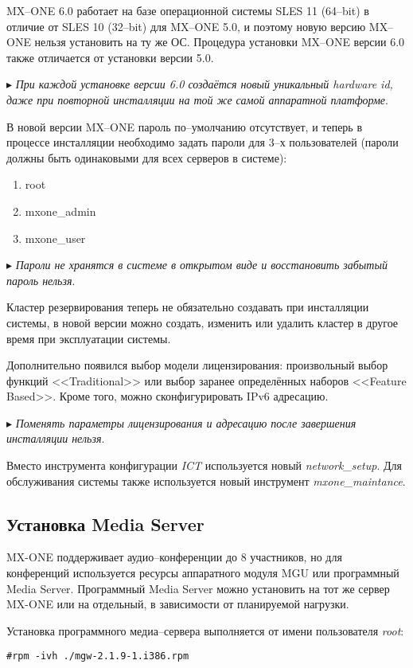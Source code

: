 MX--ONE 6.0 работает на базе операционной системы SLES 11 (64--bit) в отличие от SLES 10 (32--bit) для MX--ONE 5.0, и поэтому новую версию MX--ONE нельзя установить на ту же ОС. Процедура установки MX--ONE версии 6.0 также отличается от установки версии 5.0.

$\blacktriangleright$ {\em При каждой установке версии 6.0 создаётся новый уникальный {\em hardware id}, даже при повторной инсталляции на той же самой аппаратной платформе}.

В новой версии MX--ONE пароль по--умолчанию отсутствует, и теперь в процессе инсталляции необходимо задать пароли для 3--х пользователей (пароли должны быть одинаковыми для всех серверов в системе):
\begin{enumerate}
	\item root
	\item mxone\_admin
	\item mxone\_user
\end{enumerate}

$\blacktriangleright$ {\em Пароли не хранятся в системе в открытом виде и восстановить забытый пароль нельзя}.

Кластер резервирования теперь не обязательно создавать при инсталляции системы, в новой версии можно создать, изменить или удалить кластер в другое время при эксплуатации системы.

Дополнительно появился выбор модели лицензирования: произвольный выбор функций <<Traditional>> или выбор заранее определённых наборов <<Feature Based>>. Кроме того, можно сконфигурировать IPv6 адресацию.

$\blacktriangleright$ {\em Поменять параметры лицензирования и адресацию после завершения инсталляции нельзя}.

Вместо инструмента конфигурации {\em ICT} используется новый {\em network\_setup}. Для обслуживания системы также используется новый инструмент {\em mxone\_maintance}. 

\subsection{Установка Media Server}

MX-ONE поддерживает аудио--конференции до 8 участников, но для конференций используется ресурсы аппаратного модуля MGU или программный Media Server. Программный Media Server можно установить на тот же сервер MX-ONE или на отдельный, в зависимости от планируемой нагрузки.

Установка программного медиа--сервера выполняется от имени пользователя {\em root}:
\begin{lstlisting}
#rpm -ivh ./mgw-2.1.9-1.i386.rpm
\end{lstlisting}

